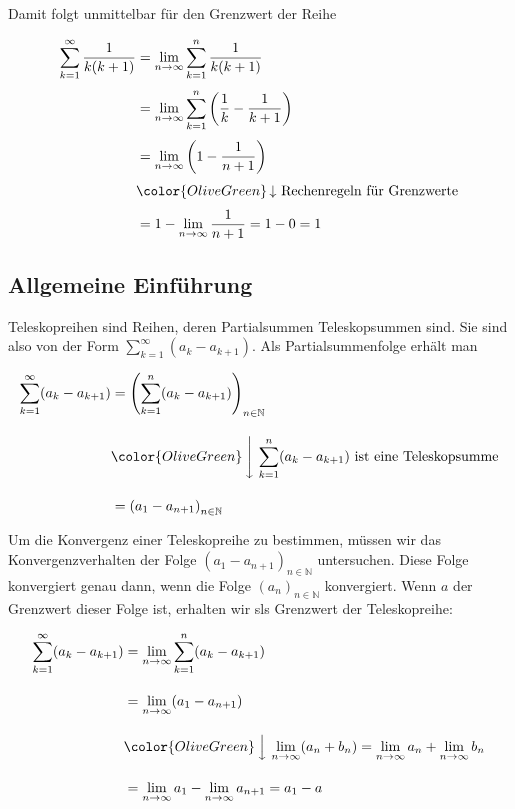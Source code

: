 \documentclass[fontsize=9pt,
               parskip=half-,
               DIV=14,
               listof=chapterentry,
               tocflat]{scrbook}
\begin{document}
Damit folgt unmittelbar für den Grenzwert der Reihe

\begin{align*}
\sum _{k=1}^{\infty }{\frac {1}{k(k+1)}}&=\lim _{n\to \infty }\sum _{k=1}^{n}{\frac {1}{k(k+1)}}\\[0.3em]&=\lim _{n\to \infty }\sum _{k=1}^{n}\left({\frac {1}{k}}-{\frac {1}{k+1}}\right)\\[0.3em]&=\lim _{n\to \infty }\left(1-{\frac {1}{n+1}}\right)\\[0.3em]&{\color {OliveGreen}\left\downarrow \ {\text{Rechenregeln für Grenzwerte}}\right.}\\[0.3em]&=1-\lim _{n\to \infty }{\frac {1}{n+1}}=1-0=1
\end{align*}

\subsection{Allgemeine Einführung}

Teleskopreihen sind Reihen, deren Partialsummen Teleskopsummen sind. Sie sind also von der Form $\sum _{k=1}^{\infty }(a_{k}-a_{k+1})$. Als Partialsummenfolge erhält man

\begin{align*}
\sum _{k=1}^{\infty }(a_{k}-a_{k+1})&=\left(\sum _{k=1}^{n}(a_{k}-a_{k+1})\right)_{n\in \mathbb {N} }\\[1em]&{\color {OliveGreen}\left\downarrow \ \sum _{k=1}^{n}(a_{k}-a_{k+1}){\text{ ist eine Teleskopsumme}}\right.}\\[1em]&=\left(a_{1}-a_{n+1}\right)_{n\in \mathbb {N} }
\end{align*}

Um die Konvergenz einer Teleskopreihe zu bestimmen, müssen wir das Konvergenzverhalten der Folge $\left(a_{1}-a_{n+1}\right)_{n\in \mathbb {N} }$ untersuchen. Diese Folge konvergiert genau dann, wenn die Folge $(a_{n})_{n\in \mathbb {N} }$ konvergiert. Wenn $a$ der Grenzwert dieser Folge ist, erhalten wir sls Grenzwert der Teleskopreihe:

\begin{align*}
\sum _{k=1}^{\infty }(a_{k}-a_{k+1})&=\lim _{n\to \infty }\sum _{k=1}^{n}(a_{k}-a_{k+1})\\[1em]&=\lim _{n\to \infty }(a_{1}-a_{n+1})\\[1em]&{\color {OliveGreen}\left\downarrow \ \lim _{n\to \infty }(a_{n}+b_{n})=\lim _{n\to \infty }a_{n}+\lim _{n\to \infty }b_{n}\right.}\\[1em]&=\lim _{n\to \infty }a_{1}-\lim _{n\to \infty }a_{n+1}=a_{1}-a
\end{align*}
\end{document}
